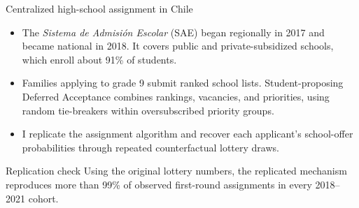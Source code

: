 \documentclass[11pt,aspectratio=169]{beamer}
\newenvironment{wideitemize}{%
  \begin{minipage}{0.92\textwidth}
  \begin{itemize}
  \addtolength{\itemsep}{0.75em}
}{%
  \end{itemize}
  \end{minipage}
}
\begin{document}
\begin{frame}{Centralized high-school assignment in Chile}
\small
\begin{wideitemize}
  \addtolength{\itemsep}{-0.2em}
  \item The \textit{Sistema de Admisi\'on Escolar} (SAE) began regionally in 2017 and became national in 2018. It covers public and private-subsidized schools, which enroll about 91\% of students.
  \item Families applying to grade 9 submit ranked school lists. Student-proposing Deferred Acceptance combines rankings, vacancies, and priorities, using random tie-breakers within oversubscribed priority groups.
  \item I replicate the assignment algorithm and recover each applicant's school-offer probabilities through repeated counterfactual lottery draws.
\end{wideitemize}

\vspace{0.15em}
\begin{alertblock}{Replication check}
\footnotesize
Using the original lottery numbers, the replicated mechanism reproduces more than 99\% of observed first-round assignments in every 2018--2021 cohort.
\end{alertblock}
\end{frame}
\end{document}
